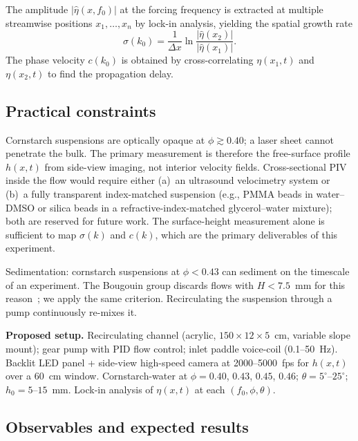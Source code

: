 \documentclass[aps,preprint,superscriptaddress,longbibliography]{revtex4-2}
\begin{document}
The amplitude $|\hat{\eta}(x,f_0)|$ at the forcing frequency is extracted at
multiple streamwise positions $x_1,\ldots,x_n$ by lock-in analysis, yielding
the spatial growth rate
\begin{equation}
  \sigma(k_0) = \frac{1}{\Delta x}\ln\frac{|\hat{\eta}(x_2)|}{|\hat{\eta}(x_1)|}.
  \label{eq:sigma}
\end{equation}
The phase velocity $c(k_0)$ is obtained by cross-correlating $\eta(x_1,t)$
and $\eta(x_2,t)$ to find the propagation delay.

\subsection{Practical constraints}

Cornstarch suspensions are optically opaque at $\phi \gtrsim 0.40$; a laser
sheet cannot penetrate the bulk.  The primary measurement is therefore the
free-surface profile $h(x,t)$ from side-view imaging, not interior velocity
fields.  Cross-sectional PIV inside the flow would require either (a)~an
ultrasound velocimetry system or (b)~a fully transparent index-matched
suspension (e.g., PMMA beads in water--DMSO or silica beads in a
refractive-index-matched glycerol--water mixture); both are reserved for
future work.  The surface-height measurement alone is sufficient to map
$\sigma(k)$ and $c(k)$, which are the primary deliverables of this experiment.

Sedimentation: cornstarch suspensions at $\phi < 0.43$ can sediment on the
timescale of an experiment.  The Bougouin group discards flows with $H < 7.5$~mm
for this reason~\cite{Bougouin2026PRL}; we apply the same criterion.
Recirculating the suspension through a pump continuously re-mixes it.

\begin{mdframed}[style=setupbox]
\textbf{Proposed setup.}
Recirculating channel (acrylic, $150 \times 12 \times 5$~cm, variable slope
mount); gear pump with PID flow control; inlet paddle voice-coil (0.1--50~Hz).
Backlit LED panel + side-view high-speed camera at 2000--5000~fps for $h(x,t)$
over a 60~cm window.  Cornstarch-water at $\phi = 0.40$, $0.43$, $0.45$, $0.46$;
$\theta = 5^\circ$--$25^\circ$; $h_0 = 5$--$15$~mm.  Lock-in analysis of
$\eta(x,t)$ at each $(f_0, \phi, \theta)$.
\end{mdframed}

\subsection{Observables and expected results}
\end{document}

